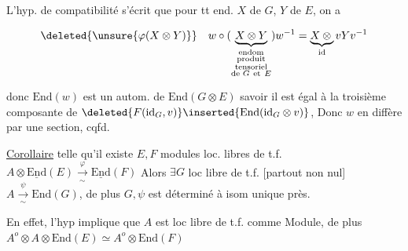 L'hyp. de compatibilité
s'écrit que pour tt end. $X$ de $G$, $Y$ de $E$, on a

\[
\deleted{\unsure{\varphi(X\otimes Y)}}\quad
w\circ(\underbrace{X\otimes Y}_{\substack{\text{endom}\\\text{produit}\\\text{tensoriel}\\\text{de }G\ \mathrm{et}\ E}})w^{-1}
=\underbrace{X\otimes{}}_{\mathrm{id}}vYv^{-1}
\]

donc $\mathrm{End}(w)$ est un autom.  de $\mathrm{End}(G\otimes E)$ 
 savoir il
est égal à la troisième composante de $\deleted{F(\mathrm{id}_G,v)}\inserted{\mathrm{End}(\mathrm{id}_G\otimes v)}$, 
 Donc $w$ en diffère par une  section, cqfd.

\uline{Corollaire} 
telle qu'il existe $E,F$ modules loc. libres de t.f. 
$A\otimes\underline{\mathrm{End}}(E)\xrightarrow[\sim]{\varphi}\underline{\mathrm{End}}(F)$ 
Alors  $\exists G$ loc libre de t.f. [partout non nul]
 $A\xrightarrow[\sim]{\psi}\mathrm{End}(G)$, de plus $G,\psi$ est déterminé
à isom unique près.

En effet, l'hyp implique que $A$ est loc libre de t.f. comme
Module, de plus $A^o\otimes A\otimes\mathrm{End}(E)\simeq A^o\otimes\mathrm{End}(F)$
